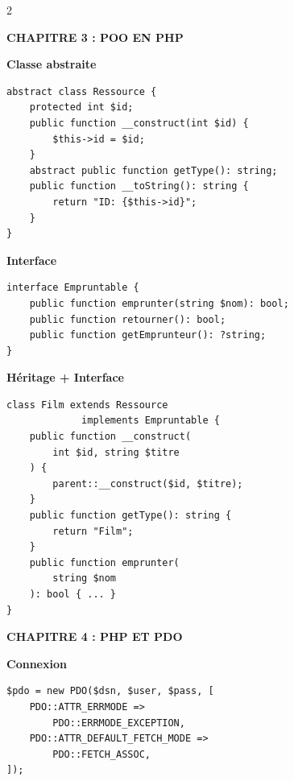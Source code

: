 \documentclass[11pt,a4paper]{article}
\begin{document}
\begin{multicols}{2}

\noindent\colorbox{uirblue!15}{\parbox{\linewidth-2pt}{\bfseries CHAPITRE 3 : POO EN PHP}}

\vspace{4pt}
\textcolor{uirblue}{\textbf{Classe abstraite}}
\begin{lstlisting}[language=PHP2, numbers=none]
abstract class Ressource {
    protected int $id;
    public function __construct(int $id) {
        $this->id = $id;
    }
    abstract public function getType(): string;
    public function __toString(): string {
        return "ID: {$this->id}";
    }
}
\end{lstlisting}

\vspace{4pt}
\textcolor{uirblue}{\textbf{Interface}}
\begin{lstlisting}[language=PHP2, numbers=none]
interface Empruntable {
    public function emprunter(string $nom): bool;
    public function retourner(): bool;
    public function getEmprunteur(): ?string;
}
\end{lstlisting}

\vspace{4pt}
\textcolor{uirblue}{\textbf{Héritage + Interface}}
\begin{lstlisting}[language=PHP2, numbers=none]
class Film extends Ressource
             implements Empruntable {
    public function __construct(
        int $id, string $titre
    ) {
        parent::__construct($id, $titre);
    }
    public function getType(): string {
        return "Film";
    }
    public function emprunter(
        string $nom
    ): bool { ... }
}
\end{lstlisting}

\columnbreak

\noindent\colorbox{uirblue!15}{\parbox{\linewidth-2pt}{\bfseries CHAPITRE 4 : PHP ET PDO}}

\vspace{4pt}
\textcolor{uirblue}{\textbf{Connexion}}
\begin{lstlisting}[language=PHP2, numbers=none]
$pdo = new PDO($dsn, $user, $pass, [
    PDO::ATTR_ERRMODE =>
        PDO::ERRMODE_EXCEPTION,
    PDO::ATTR_DEFAULT_FETCH_MODE =>
        PDO::FETCH_ASSOC,
]);
\end{lstlisting}


\end{multicols}
\end{document}
